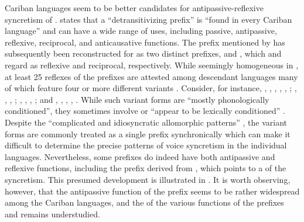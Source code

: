 Cariban languages seem to be better candidates for antipassive-reflexive syncretism of . \citet[217ff.]{meira:2000} states that a “detransitivizing prefix” is “found in every Cariban language” and can have a wide range of uses, including passive, antipassive, reflexive, reciprocal, and anticausative functions. The prefix mentioned by \citeauthor{meira:2000} has subsequently been reconstructed for  as two distinct prefixes,  and , which \citet[512]{meira:al:2010} and \citet[9]{gildea:2015} regard as reflexive and reciprocal, respectively. While seemingly homogeneous in , at least 25 reflexes of the prefixes are attested among descendant languages many of which feature four or more different variants \citep[506]{meira:al:2010}. Consider, for instance,  , , , , , ;  , , , ;  , , , ; and  , , , ,  \citep[217f.]{meira:2000}. While such variant forms are “mostly phonologically conditioned”, they sometimes involve  \citep[2]{gildea:al:2016} or “appear to be lexically conditioned” \citep[217]{meira:2000}. Despite the “complicated and idiosyncratic allomorphic patterns” \citep[217]{meira:2000}, the variant forms are commonly treated as a single prefix synchronically which can make it difficult to determine the precise patterns of voice syncretism in the individual languages. Nevertheless, some prefixes do indeed have both antipassive and reflexive functions, including the prefix  derived from   \citep[511]{meira:al:2010}, which points to a  of the syncretism. This presumed development is illustrated in  \citep{meira:2000}. It is worth observing, however, that the antipassive function of the prefix  seems to be rather widespread among the Cariban languages, and the  of the various functions of the  prefixes  and  remains understudied.

